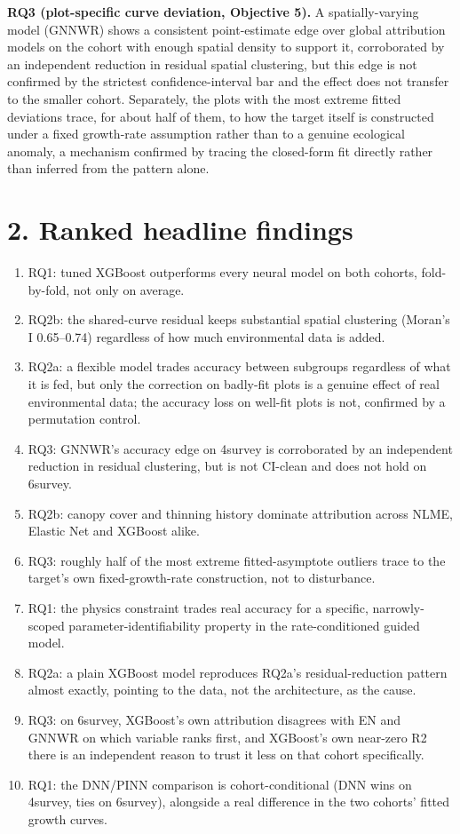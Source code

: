 \documentclass[11pt,a4paper]{report}
\begin{document}
\textbf{RQ3 (plot-specific curve deviation, Objective 5).} A spatially-varying model
(GNNWR) shows a consistent point-estimate edge over global attribution models on the
cohort with enough spatial density to support it, corroborated by an independent
reduction in residual spatial clustering, but this edge is not confirmed by the
strictest confidence-interval bar and the effect does not transfer to the smaller
cohort. Separately, the plots with the most extreme fitted deviations trace, for about
half of them, to how the target itself is constructed under a fixed growth-rate
assumption rather than to a genuine ecological anomaly, a mechanism confirmed by
tracing the closed-form fit directly rather than inferred from the pattern alone.

\section*{2. Ranked headline findings}

\begin{enumerate}
\item RQ1: tuned XGBoost outperforms every neural model on both cohorts, fold-by-fold,
  not only on average.
\item RQ2b: the shared-curve residual keeps substantial spatial clustering
  (Moran's I 0.65--0.74) regardless of how much environmental data is added.
\item RQ2a: a flexible model trades accuracy between subgroups regardless of what it
  is fed, but only the correction on badly-fit plots is a genuine effect of real
  environmental data; the accuracy loss on well-fit plots is not, confirmed by a
  permutation control.
\item RQ3: GNNWR's accuracy edge on 4survey is corroborated by an independent
  reduction in residual clustering, but is not CI-clean and does not hold on 6survey.
\item RQ2b: canopy cover and thinning history dominate attribution across NLME,
  Elastic Net and XGBoost alike.
\item RQ3: roughly half of the most extreme fitted-asymptote outliers trace to the
  target's own fixed-growth-rate construction, not to disturbance.
\item RQ1: the physics constraint trades real accuracy for a specific, narrowly-scoped
  parameter-identifiability property in the rate-conditioned guided model.
\item RQ2a: a plain XGBoost model reproduces RQ2a's residual-reduction pattern almost
  exactly, pointing to the data, not the architecture, as the cause.
\item RQ3: on 6survey, XGBoost's own attribution disagrees with EN and GNNWR on which
  variable ranks first, and XGBoost's own near-zero R2 there is an independent reason
  to trust it less on that cohort specifically.
\item RQ1: the DNN/PINN comparison is cohort-conditional (DNN wins on 4survey, ties on
  6survey), alongside a real difference in the two cohorts' fitted growth curves.
\end{enumerate}
\end{document}
